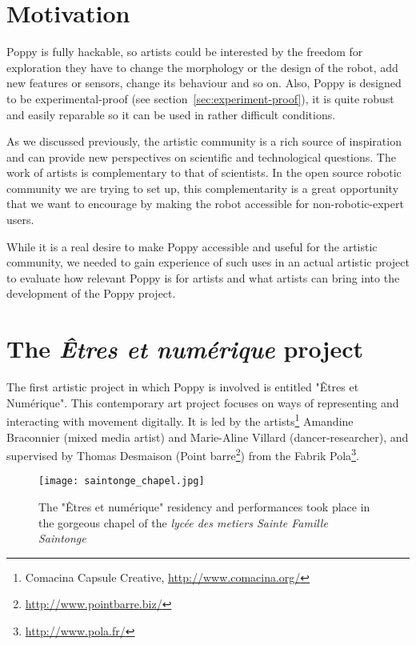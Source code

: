 \section{Motivation } %
\label{sec:motivation}

Poppy is fully hackable, so artists could be interested by the freedom for exploration they have to change the morphology or the design of the robot, add new features or sensors, change its behaviour and so on. Also, Poppy is designed to be experimental-proof (see section~\ref{sec:experiment-proof}), it is quite robust and easily reparable so it can be used in rather difficult conditions.

As we discussed previously, the artistic community is a rich source of inspiration and can provide new perspectives on scientific and technological questions. The work of artists is complementary to that of scientists. In the open source robotic community we are trying to set up, this complementarity is a great opportunity that we want to encourage by making the robot accessible for non-robotic-expert users.

While it is a real desire to make Poppy accessible and useful for the artistic community, we needed to gain experience of such uses in an actual artistic project to evaluate how relevant Poppy is for artists and what artists can bring into the development of the Poppy project.


\section{The \emph{Êtres et numérique} project} %

The first artistic project in which Poppy is involved is entitled "Êtres et Numérique". This contemporary art project focuses on ways of representing and interacting with movement digitally. It is led by the artists\footnote{Comacina Capsule Creative, \url{http://www.comacina.org/}} Amandine Braconnier (mixed media artist) and Marie-Aline Villard (dancer-researcher), and supervised by Thomas Desmaison (Point barre\footnote{\url{http://www.pointbarre.biz/}}) from the Fabrik Pola\footnote{\url{http://www.pola.fr/}}.

\begin{figure}[tb]
    \begin{center}
        \texttt{[image: saintonge\_chapel.jpg]}
    \end{center}
    \caption{The "Êtres et numérique" residency and performances took place in the gorgeous chapel of the \emph{lycée des metiers Sainte Famille Saintonge}}
    \label{fig:saintonge_chapel}
\end{figure}

